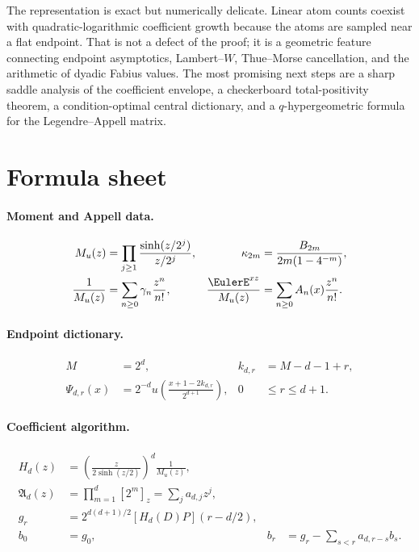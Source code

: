 \documentclass[11pt,oneside]{article}
\theoremstyle{definition}
\theoremstyle{remark}
\begin{document}
The representation is exact but numerically delicate.  Linear atom counts
coexist with quadratic-logarithmic coefficient growth because the atoms are
sampled near a flat endpoint.  That is not a defect of the proof; it is a
geometric feature connecting endpoint asymptotics, Lambert--$W$, Thue--Morse
cancellation, and the arithmetic of dyadic Fabius values.  The most promising
next steps are a sharp saddle analysis of the coefficient envelope, a
checkerboard total-positivity theorem, a condition-optimal central dictionary,
and a $q$-hypergeometric formula for the Legendre--Appell matrix.

\appendix

\section{Formula sheet}

\paragraph{Moment and Appell data.}
\begin{align*}
 M_u(z)&=\prod_{j\ge1}\frac{\sinh(z/2^j)}{z/2^j},
 &\kappa_{2m}&=\frac{B_{2m}}{2m(1-4^{-m})},\\
 \frac1{M_u(z)}&=\sum_{n\ge0}\gamma_n\frac{z^n}{n!},
 &\frac{\EulerE^{xz}}{M_u(z)}&=\sum_{n\ge0}A_n(x)\frac{z^n}{n!}.
\end{align*}

\paragraph{Endpoint dictionary.}
\begin{align*}
 M&=2^d,& k_{d,r}&=M-d-1+r,\\
 \Psi_{d,r}(x)&=2^{-d}u\!\left(\frac{x+1-2k_{d,r}}{2^{d+1}}\right),
 &0&\le r\le d+1.
\end{align*}

\paragraph{Coefficient algorithm.}
\begin{align*}
 H_d(z)&=\left(\frac{z}{2\sinh(z/2)}\right)^d\frac1{M_u(z)},\\
 \mathfrak A_d(z)&=\prod_{m=1}^d[2^m]_z=\sum_ja_{d,j}z^j,\\
 g_r&=2^{d(d+1)/2}[H_d(D)P](r-d/2),\\
 b_0&=g_0,
 &b_r&=g_r-\sum_{s<r}a_{d,r-s}b_s.
\end{align*}
\end{document}
